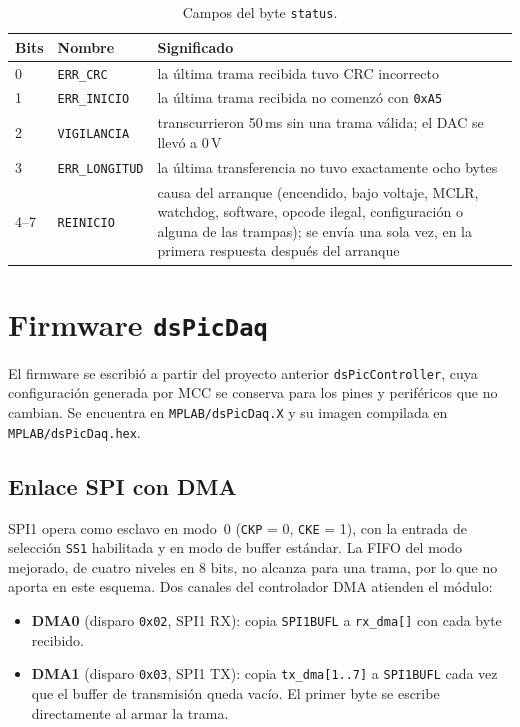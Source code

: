 \documentclass[11pt]{article}
\newcommand{\code}[1]{\texttt{#1}}
\begin{document}
\begin{table}[H]
\centering
\small
\begin{tabularx}{\linewidth}{@{}llX@{}}
\toprule
Bits & Nombre & Significado \\
\midrule
0 & \code{ERR\_CRC} & la última trama recibida tuvo CRC incorrecto \\
1 & \code{ERR\_INICIO} & la última trama recibida no comenzó con \code{0xA5} \\
2 & \code{VIGILANCIA} & transcurrieron 50\,ms sin una trama válida; el DAC se llevó a 0\,V \\
3 & \code{ERR\_LONGITUD} & la última transferencia no tuvo exactamente ocho bytes \\
4--7 & \code{REINICIO} & causa del arranque (encendido, bajo voltaje, MCLR, watchdog, software, opcode ilegal, configuración o alguna de las trampas); se envía una sola vez, en la primera respuesta después del arranque \\
\bottomrule
\end{tabularx}
\caption{Campos del byte \code{status}.}
\label{tab:status}
\end{table}

\section{Firmware \code{dsPicDaq}}

El firmware se escribió a partir del proyecto anterior
\code{dsPicController}, cuya configuración generada por MCC se conserva
para los pines y periféricos que no cambian. Se encuentra en
\code{MPLAB/dsPicDaq.X} y su imagen compilada en \code{MPLAB/dsPicDaq.hex}.

\subsection{Enlace SPI con DMA}

SPI1 opera como esclavo en modo~0 (\code{CKP} = 0, \code{CKE} = 1), con la
entrada de selección \code{SS1} habilitada y en modo de buffer estándar. La
FIFO del modo mejorado, de cuatro niveles en 8 bits, no alcanza para una
trama, por lo que no aporta en este esquema. Dos canales del controlador DMA
atienden el módulo:

\begin{itemize}
\item \textbf{DMA0} (disparo \code{0x02}, SPI1 RX): copia \code{SPI1BUFL} a
  \code{rx\_dma[]} con cada byte recibido.
\item \textbf{DMA1} (disparo \code{0x03}, SPI1 TX): copia \code{tx\_dma[1..7]}
  a \code{SPI1BUFL} cada vez que el buffer de transmisión queda vacío. El
  primer byte se escribe directamente al armar la trama.
\end{itemize}
\end{document}
